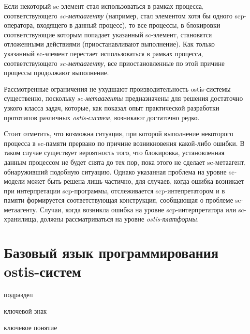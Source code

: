 Если некоторый sc-элемент стал использоваться в рамках процесса, соответствующего \textit{sc-метаагенту} (например, стал элементом хотя бы одного scp-оператора, входящего в данный процесс), то все процессы, в блокировки соответствующие которым попадает указанный sc-элемент, становятся отложенными действиями (приостанавливают выполнение). Как только указанный sc-элемент перестает использоваться в рамках процесса, соответствующего \textit{sc-метаагенту}, все приостановленные по этой причине процессы продолжают выполнение.

Рассмотренные ограничения не ухудшают производительность ostis-системы существенно, поскольку \textit{sc-мета\-аген\-ты} предназначены для решения достаточно узкого класса задач, которые, как показал опыт практической разработки прототипов различных \textit{ostis-систем}, возникают достаточно редко.
	
Стоит отметить, что возможна ситуация, при которой выполнение некоторого процесса в sc-памяти прервано по причине возникновения какой-либо ошибки. В таком случае существует вероятность того, что блокировка, установленная данным процессом не будет снята до тех пор, пока этого не сделает sc-метаагент, обнаруживший подобную ситуацию. Однако указанная проблема на уровне sc-модели может быть решена лишь частично, для случаев, когда ошибка возникает при интерпретации scp-программы, отслеживается scp-интепретатором и в памяти формируется соответствующая конструкция, сообщающая о проблеме sc-метаагенту. Случаи, когда возникла ошибка на уровне scp-интерпретатора или sc-хранилища, должны рассматриваться на уровне \textit{ostis-платформы}.

\section{Базовый язык программирования ostis-систем}
\label{sec_ps_scp}

\begin{SCn}
\begin{scnrelfromlist}{подраздел}
\end{scnrelfromlist}
\begin{scnrelfromlist}{ключевой знак}
\end{scnrelfromlist}
\begin{scnrelfromlist}{ключевое понятие}
\end{scnrelfromlist}
\end{SCn}

